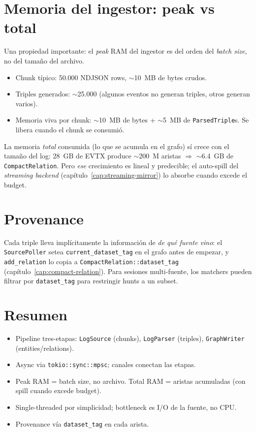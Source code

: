 \section{Memoria del ingestor: peak vs total}

Una propiedad importante: el \emph{peak} RAM del ingestor es del
orden del \emph{batch size}, no del tamaño del archivo.

\begin{itemize}
    \item Chunk típico: 50.000 NDJSON rows, $\sim$10~MB de bytes
    crudos.
    \item Triples generados: $\sim$25.000 (algunos eventos no
    generan triples, otros generan varios).
    \item Memoria viva por chunk: $\sim$10~MB de bytes + $\sim$5~MB
    de \texttt{ParsedTriple}s. Se libera cuando el chunk se
    consumió.
\end{itemize}

\noindent
La memoria \emph{total} consumida (lo que se acumula en el grafo)
sí crece con el tamaño del log: 28~GB de EVTX produce $\sim$200~M
aristas $\Rightarrow$ $\sim$6.4~GB de \texttt{CompactRelation}.
Pero \emph{ese} crecimiento es lineal y predecible; el auto-spill
del \emph{streaming backend} (capítulo~\ref{cap:streaming-mirror})
lo absorbe cuando excede el budget.

\section{Provenance}

Cada triple lleva implícitamente la información de \emph{de qué
fuente vino}: el \texttt{SourcePoller} setea
\texttt{current\_dataset\_tag} en el grafo antes de empezar, y
\texttt{add\_relation} lo copia a \texttt{CompactRelation::dataset\_tag}
(capítulo~\ref{cap:compact-relation}). Para sesiones multi-fuente,
los matchers pueden filtrar por \texttt{dataset\_tag} para
restringir hunts a un subset.

\section{Resumen}

\begin{itemize}
    \item Pipeline tres-etapas: \texttt{LogSource} (chunks),
    \texttt{LogParser} (triples), \texttt{GraphWriter}
    (entities/relations).
    \item Async via \texttt{tokio::sync::mpsc}; canales conectan las
    etapas.
    \item Peak RAM = batch size, no archivo. Total RAM = aristas
    acumuladas (con spill cuando excede budget).
    \item Single-threaded por simplicidad; bottleneck es I/O de la
    fuente, no CPU.
    \item Provenance vía \texttt{dataset\_tag} en cada arista.
\end{itemize}

